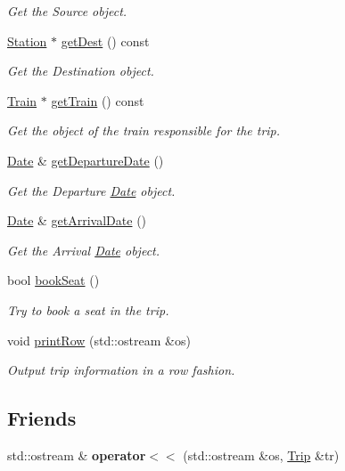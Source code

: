 \begin{DoxyCompactItemize}
\begin{DoxyCompactList}\small\item\em Get the Source object. \end{DoxyCompactList}\item 
\mbox{\hyperlink{classStation}{Station}} $\ast$ \mbox{\hyperlink{classTrip_a459ae85fc25404ba616fabfb4b4165f4}{get\+Dest}} () const
\begin{DoxyCompactList}\small\item\em Get the Destination object. \end{DoxyCompactList}\item 
\mbox{\hyperlink{classTrain}{Train}} $\ast$ \mbox{\hyperlink{classTrip_a7595a39e9aa91e321d37b1696da50024}{get\+Train}} () const
\begin{DoxyCompactList}\small\item\em Get the object of the train responsible for the trip. \end{DoxyCompactList}\item 
\mbox{\hyperlink{classDate}{Date}} \& \mbox{\hyperlink{classTrip_ae7c3b34b692a17737a2b1200060fa479}{get\+Departure\+Date}} ()
\begin{DoxyCompactList}\small\item\em Get the Departure \mbox{\hyperlink{classDate}{Date}} object. \end{DoxyCompactList}\item 
\mbox{\hyperlink{classDate}{Date}} \& \mbox{\hyperlink{classTrip_a821dfd23e37c28f1c0a2dab3f2836799}{get\+Arrival\+Date}} ()
\begin{DoxyCompactList}\small\item\em Get the Arrival \mbox{\hyperlink{classDate}{Date}} object. \end{DoxyCompactList}\item 
bool \mbox{\hyperlink{classTrip_a00e2b65d40562051bfe4124f581a49e1}{book\+Seat}} ()
\begin{DoxyCompactList}\small\item\em Try to book a seat in the trip. \end{DoxyCompactList}\item 
void \mbox{\hyperlink{classTrip_a233bab5c803f51ee5e79c611a15699c0}{print\+Row}} (std\+::ostream \&os)
\begin{DoxyCompactList}\small\item\em Output trip information in a row fashion. \end{DoxyCompactList}\end{DoxyCompactItemize}
\subsection*{Friends}
\begin{DoxyCompactItemize}
\item 
\mbox{\label{classTrip_ad143ba29c1778aa25a53301503c3f2bd}} 
std\+::ostream \& {\bfseries operator$<$$<$} (std\+::ostream \&os, \mbox{\hyperlink{classTrip}{Trip}} \&tr)
\end{DoxyCompactItemize}


